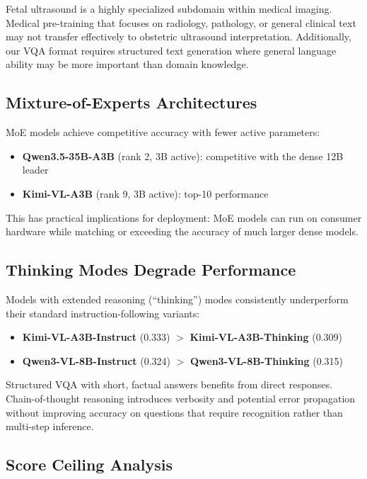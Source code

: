 \documentclass[11pt,a4paper]{article}
\begin{document}
Fetal ultrasound is a highly specialized subdomain within medical imaging. Medical pre-training that focuses on radiology, pathology, or general clinical text may not transfer effectively to obstetric ultrasound interpretation. Additionally, our VQA format requires structured text generation where general language ability may be more important than domain knowledge.

\subsection{Mixture-of-Experts Architectures}

MoE models achieve competitive accuracy with fewer active parameters:

\begin{itemize}
    \item \textbf{Qwen3.5-35B-A3B} (rank 2, 3B active): competitive with the dense 12B leader
    \item \textbf{Kimi-VL-A3B} (rank 9, 3B active): top-10 performance
\end{itemize}

This has practical implications for deployment: MoE models can run on consumer hardware while matching or exceeding the accuracy of much larger dense models.

\subsection{Thinking Modes Degrade Performance}

Models with extended reasoning (``thinking'') modes consistently underperform their standard instruction-following variants:

\begin{itemize}
    \item \textbf{Kimi-VL-A3B-Instruct} (0.333) $>$ \textbf{Kimi-VL-A3B-Thinking} (0.309)
    \item \textbf{Qwen3-VL-8B-Instruct} (0.324) $>$ \textbf{Qwen3-VL-8B-Thinking} (0.315)
\end{itemize}

Structured VQA with short, factual answers benefits from direct responses. Chain-of-thought reasoning introduces verbosity and potential error propagation without improving accuracy on questions that require recognition rather than multi-step inference.

\subsection{Score Ceiling Analysis}
\end{document}
